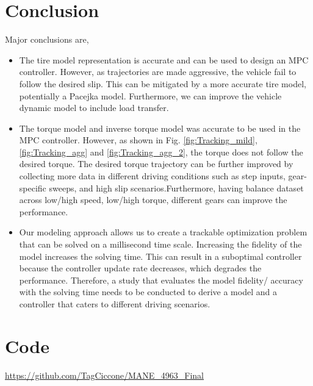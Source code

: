 \documentclass{article}
\begin{document}
\vspace{10cm}
\newpage
\section{Conclusion}

Major conclusions are,

\begin{itemize}
    \item The tire model representation is accurate and can be used to design an MPC controller. However, as trajectories are made aggressive, the vehicle fail to follow the desired slip. This can be mitigated by a more accurate tire model, potentially a Pacejka model. Furthermore, we can improve the vehicle dynamic model to include load transfer.
    \item The torque model and inverse torque model was accurate to be used in the MPC controller. However, as shown in Fig. \ref{fig:Tracking_mild}, \ref{fig:Tracking_agg} and \ref{fig:Tracking_agg_2}, the torque does not follow the desired torque. The desired torque trajectory can be further improved by collecting more data in different driving conditions such as step inputs, gear-specific sweeps, and high slip scenarios.Furthermore, having balance dataset across low/high speed, low/high torque, different gears can improve the performance.
    \item Our modeling approach allows us to create a trackable optimization problem that can be solved on a millisecond time scale. Increasing the fidelity of the model increases the solving time. This can result in a suboptimal controller because the controller update rate decreases, which degrades the performance. Therefore, a study that evaluates the model fidelity/ accuracy with the solving time needs to be conducted to derive a model and a controller that caters to different driving scenarios.
\end{itemize}

\section{Code}
    \url{https://github.com/TagCiccone/MANE_4963_Final}
\end{document}
